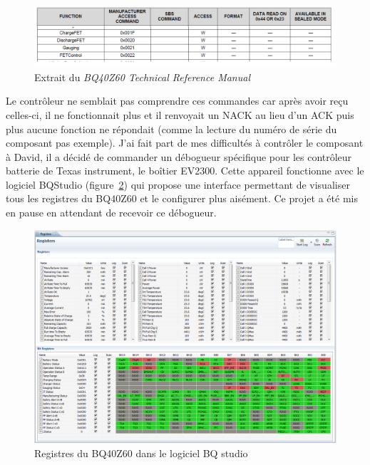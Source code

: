 \documentclass[a4paper, 12pt, sffamily]{report}
\begin{document}
\begin{figure}[H]
\centering
\includegraphics[scale=0.82]{figures/screenshots/BQ40Z60_manual_excerpt.png}
\caption{Extrait du \emph{BQ40Z60 Technical Reference Manual}\cite{BQ40Z60_tech_manual}} 
\label{fig:BQ40Z60_manual_excerpt}
\end{figure}

Le contrôleur ne semblait pas comprendre ces commandes car après avoir reçu celles-ci, il ne fonctionnait plus et il renvoyait un NACK au lieu d’un ACK puis plus aucune fonction ne répondait (comme la lecture du numéro de série du composant pas exemple).
J’ai fait part de mes difficultés à contrôler le composant à David, il a décidé de commander un débogueur spécifique pour les contrôleur batterie de Texas instrument, le boîtier EV2300. Cette appareil fonctionne avec le logiciel BQStudio (figure~\ref{fig:BQ40Z60_registers}) qui propose une interface permettant de visualiser tous les registres du BQ40Z60 et le configurer plus aisément. Ce projet a été mis en pause en attendant de recevoir ce débogueur.

\begin{figure}[H]
\centering
\includegraphics[scale=0.4]{figures/screenshots/BQ40Z60_registers.png}
\caption{Registres du BQ40Z60 dans le logiciel BQ studio}
\label{fig:BQ40Z60_registers}
\end{figure}
\end{document}
